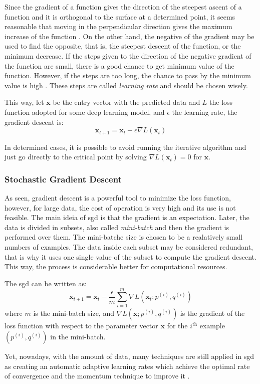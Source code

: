 Since the gradient of a function gives the direction of the steepest ascent of a function and it is orthogonal to the surface at a determined point, it seems reasonable that moving in the perpendicular direction gives the maximum increase of the function \cite{stewart2016}.
On the other hand, the negative of the gradient may be used to find the opposite, that is, the steepest descent of the function, or the minimum decrease.
If the steps given to the direction of the negative gradient of the function are small, there is a good chance to get minimum value of the function.
However, if the steps are too long, the chance to pass by the minimum value is high \citep{nielsen2015}.
These steps are called \emph{learning rate} and should be chosen wisely.

This way, let \(\symbf{x}\) be the entry vector with the predicted data and \(L\) the loss function adopted for some deep learning model, and \(\epsilon\) the learning rate, the gradient descent is:
%
\begin{equation}
    \symbf{x}_{t+1} = \symbf{x}_t - \epsilon \nabla L(\symbf{x}_t)
\end{equation}

In determined cases, it is possible to avoid running the iterative algorithm and just go directly to the critical point by solving \(\nabla L(\symbf{x}_t) = 0\) for \(\symbf{x}\).

\subsubsection*{Stochastic Gradient Descent}

As seen, gradient descent is a powerful tool to minimize the loss function, however, for large data, the cost of operation is very high and its use is not feasible. 
The main ideia of \gls*{sgd} is that the gradient is an expectation.
Later, the data is divided in subsets, also called \emph{mini-batch} and then the gradient is performed over them.
The mini-batche size is chosen to be a realatively small numbers of examples.
The data inside each subset may be considered redundant, that is why it uses one single value of the subset to compute the gradient descent.
This way, the process is considerable better for computational resources.

The \gls*{sgd} can be written as:
%
\begin{equation}
    \symbf{x}_{t+1} = \symbf{x}_t - \frac{\epsilon}{m} \sum_{i=1}^m \nabla L(\symbf{x}_t; p^{(i)},q^{(i)})
\end{equation}
%
where \(m\) is the mini-batch size, and \(\nabla L(\symbf{x}; p^{(i)}, q^{(i)})\) is the gradient of the loss function with respect to the parameter vector \(\symbf{x}\) for the \(i^{\text{th}}\) example \((p^{(i)}, q^{(i)})\) in the mini-batch.

Yet, nowadays, with the amount of data, many techniques are still applied in \gls*{sgd} as creating an automatic adaptive learning rates which achieve the optimal rate of convergence \citep{darken1991} and the momentum technique to improve it \citep{sutskever2013}.